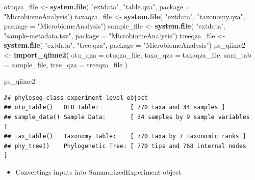 \documentclass[
]{book}
\newenvironment{Shaded}{\begin{snugshade}}{\end{snugshade}}
\newcommand{\AttributeTok}[1]{\textcolor[rgb]{0.13,0.29,0.53}{#1}}
\newcommand{\FunctionTok}[1]{\textcolor[rgb]{0.13,0.29,0.53}{\textbf{#1}}}
\newcommand{\NormalTok}[1]{#1}
\newcommand{\OtherTok}[1]{\textcolor[rgb]{0.56,0.35,0.01}{#1}}
\newcommand{\StringTok}[1]{\textcolor[rgb]{0.31,0.60,0.02}{#1}}
\providecommand{\tightlist}{%
  \setlength{\itemsep}{0pt}\setlength{\parskip}{0pt}}
\begin{document}
\begin{Shaded}
\begin{Highlighting}[]
\NormalTok{otuqza\_file }\OtherTok{\textless{}{-}} \FunctionTok{system.file}\NormalTok{(}
    \StringTok{"extdata"}\NormalTok{, }\StringTok{"table.qza"}\NormalTok{,}
    \AttributeTok{package =} \StringTok{"MicrobiomeAnalysis"}\NormalTok{)}
\NormalTok{taxaqza\_file }\OtherTok{\textless{}{-}} \FunctionTok{system.file}\NormalTok{(}
    \StringTok{"extdata"}\NormalTok{, }\StringTok{"taxonomy.qza"}\NormalTok{,}
    \AttributeTok{package =} \StringTok{"MicrobiomeAnalysis"}\NormalTok{)}
\NormalTok{sample\_file }\OtherTok{\textless{}{-}} \FunctionTok{system.file}\NormalTok{(}
    \StringTok{"extdata"}\NormalTok{, }\StringTok{"sample{-}metadata.tsv"}\NormalTok{,}
    \AttributeTok{package =} \StringTok{"MicrobiomeAnalysis"}\NormalTok{)}
\NormalTok{treeqza\_file }\OtherTok{\textless{}{-}} \FunctionTok{system.file}\NormalTok{(}
    \StringTok{"extdata"}\NormalTok{, }\StringTok{"tree.qza"}\NormalTok{,}
    \AttributeTok{package =} \StringTok{"MicrobiomeAnalysis"}\NormalTok{)}
\NormalTok{ps\_qiime2 }\OtherTok{\textless{}{-}} \FunctionTok{import\_qiime2}\NormalTok{(}
    \AttributeTok{otu\_qza =}\NormalTok{ otuqza\_file, }\AttributeTok{taxa\_qza =}\NormalTok{ taxaqza\_file,}
    \AttributeTok{sam\_tab =}\NormalTok{ sample\_file, }\AttributeTok{tree\_qza =}\NormalTok{ treeqza\_file}
\NormalTok{)}

\NormalTok{ps\_qiime2}
\end{Highlighting}
\end{Shaded}

\begin{verbatim}
## phyloseq-class experiment-level object
## otu_table()   OTU Table:         [ 770 taxa and 34 samples ]
## sample_data() Sample Data:       [ 34 samples by 9 sample variables ]
## tax_table()   Taxonomy Table:    [ 770 taxa by 7 taxonomic ranks ]
## phy_tree()    Phylogenetic Tree: [ 770 tips and 768 internal nodes ]
\end{verbatim}

\begin{itemize}
\tightlist
\item
  Convertings inputs into SummarizedExperiment object
\end{itemize}
\end{document}
